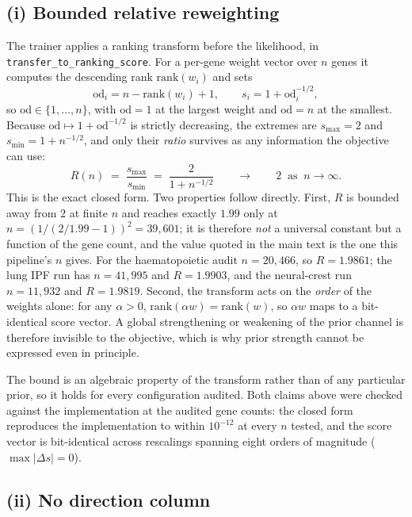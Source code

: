 \documentclass[11 pt,a4 paper]{article}
\begin{document}
\subsection*{(i) Bounded relative reweighting}

The trainer applies a ranking transform before the likelihood, in
\texttt{transfer\_to\_ranking\_score}. For a per-gene weight vector over $n$ genes it
computes the descending rank $\mathrm{rank}(w_i)$ and sets
\begin{equation}
\mathrm{od}_i = n - \mathrm{rank}(w_i) + 1, \qquad s_i = 1 + \mathrm{od}_i^{-1/2},
\end{equation}
so $\mathrm{od}\in\{1,\dots,n\}$, with $\mathrm{od}=1$ at the largest weight and
$\mathrm{od}=n$ at the smallest. Because $\mathrm{od}\mapsto 1+\mathrm{od}^{-1/2}$ is
strictly decreasing, the extremes are $s_{\max}=2$ and $s_{\min}=1+n^{-1/2}$, and only
their \emph{ratio} survives as any information the objective can use:
\begin{equation}
R(n) \;=\; \frac{s_{\max}}{s_{\min}} \;=\; \frac{2}{1+n^{-1/2}}
\qquad\longrightarrow\qquad 2 \ \text{ as } \ n\to\infty .
\end{equation}
This is the exact closed form. Two properties follow directly. First, $R$ is bounded away
from $2$ at finite $n$ and reaches exactly $1.99$ only at
$n=(1/(2/1.99-1))^2=39{,}601$; it is therefore \emph{not} a universal constant but a
function of the gene count, and the value quoted in the main text is the one this
pipeline's $n$ gives. For the haematopoietic audit $n=20{,}466$, so $R=1.9861$; the
lung IPF run has $n=41{,}995$ and $R=1.9903$, and the neural-crest run $n=11{,}932$ and
$R=1.9819$. Second, the transform acts on the \emph{order} of the weights alone: for any
$\alpha>0$, $\mathrm{rank}(\alpha w)=\mathrm{rank}(w)$, so $\alpha w$ maps to a
bit-identical score vector. A global strengthening or weakening of the prior channel is
therefore invisible to the objective, which is why prior strength cannot be expressed even
in principle.

The bound is an algebraic property of the transform rather than of any particular prior, so
it holds for every configuration audited. Both claims above were checked against the
implementation at the audited gene counts: the closed form reproduces the implementation to
within $10^{-12}$ at every $n$ tested, and the score vector is bit-identical across
rescalings spanning eight orders of magnitude ($\max|\Delta s| = 0$).

\subsection*{(ii) No direction column}
\end{document}
